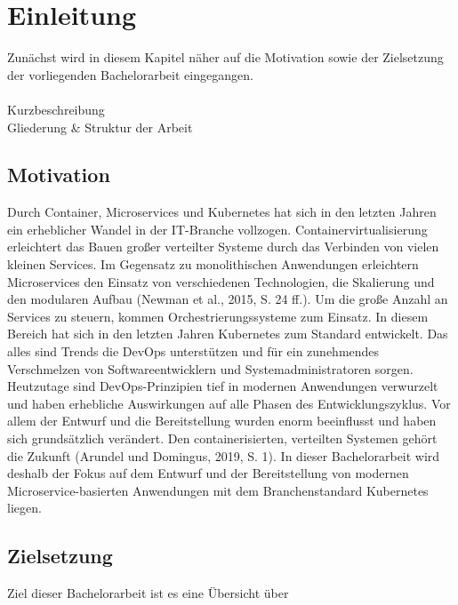 \section{Einleitung}

\vspace{1em} 
Zunächst wird in diesem Kapitel näher auf die Motivation sowie der Zielsetzung der vorliegenden Bachelorarbeit eingegangen.
\\
\\
{Kurzbeschreibung} \\
{Gliederung \& Struktur der Arbeit}


\subsection{Motivation}
Durch Container, Microservices und Kubernetes hat sich in den letzten Jahren ein erheblicher
Wandel in der IT-Branche vollzogen. Containervirtualisierung erleichtert das Bauen großer
verteilter Systeme durch das Verbinden von vielen kleinen Services. Im Gegensatz zu
monolithischen Anwendungen erleichtern Microservices den Einsatz von verschiedenen
Technologien, die Skalierung und den modularen Aufbau (Newman et al., 2015, S. 24 ff.).
Um die große Anzahl an Services zu steuern, kommen Orchestrierungssysteme zum Einsatz.
In diesem Bereich hat sich in den letzten Jahren Kubernetes zum Standard entwickelt. Das
alles sind Trends die DevOps unterstützen und für ein zunehmendes Verschmelzen von
Softwareentwicklern und Systemadministratoren sorgen. Heutzutage sind DevOps-Prinzipien
tief in modernen Anwendungen verwurzelt und haben erhebliche Auswirkungen auf alle
Phasen des Entwicklungszyklus. Vor allem der Entwurf und die Bereitstellung wurden enorm
beeinflusst und haben sich grundsätzlich verändert. Den containerisierten, verteilten Systemen
gehört die Zukunft (Arundel und Domingus, 2019, S. 1). In dieser Bachelorarbeit wird deshalb
der Fokus auf dem Entwurf und der Bereitstellung von modernen Microservice-basierten
Anwendungen mit dem Branchenstandard Kubernetes liegen.


\subsection{Zielsetzung}
Ziel dieser Bachelorarbeit ist es eine Übersicht über 

